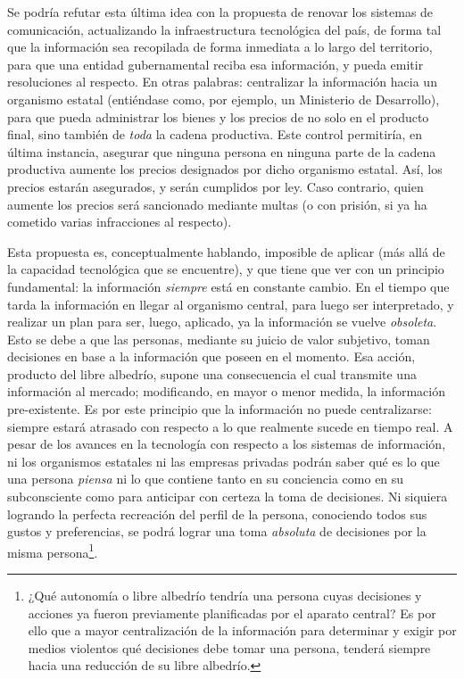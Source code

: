 \documentclass[12pt,a4paper,twoside]{book}
\begin{document}
Se podría refutar esta última idea con la propuesta de renovar los sistemas de comunicación, actualizando la infraestructura tecnológica del país, de forma tal que la información sea recopilada de forma inmediata a lo largo del territorio, para que una entidad gubernamental reciba esa información, y pueda emitir resoluciones al respecto. En otras palabras: centralizar la información hacia un organismo estatal (entiéndase como, por ejemplo, un Ministerio de Desarrollo), para que pueda administrar los bienes y los precios de no solo en el producto final, sino también de \textit{toda} la cadena productiva. Este control permitiría, en última instancia, asegurar que ninguna persona en ninguna parte de la cadena productiva aumente los precios designados por dicho organismo estatal. Así, los precios estarán asegurados, y serán cumplidos por ley. Caso contrario, quien aumente los precios será sancionado mediante multas (o con prisión, si ya ha cometido varias infracciones al respecto).

Esta propuesta es, conceptualmente hablando, imposible de aplicar (más allá de la capacidad tecnológica que se encuentre), y que tiene que ver con un principio fundamental: la información \textit{siempre} está en constante cambio. En el tiempo que tarda la información en llegar al organismo central, para luego ser interpretado, y realizar un plan para ser, luego, aplicado, ya la información se vuelve \textit{obsoleta}. Esto se debe a que las personas, mediante su juicio de valor subjetivo, toman decisiones en base a la información que poseen en el momento. Esa acción, producto del libre albedrío, supone una consecuencia el cual transmite una información al mercado; modificando, en mayor o menor medida, la información pre-existente. Es por este principio que la información no puede centralizarse: siempre estará atrasado con respecto a lo que realmente sucede en tiempo real. A pesar de los avances en la tecnología con respecto a los sistemas de información, ni los organismos estatales ni las empresas privadas podrán saber qué es lo que una persona \textit{piensa} ni lo que contiene tanto en su conciencia como en su subconsciente como para anticipar con certeza la toma de decisiones. Ni siquiera logrando la perfecta recreación del perfil de la persona, conociendo todos sus gustos y preferencias, se podrá lograr una toma \textit{absoluta} de decisiones por la misma persona\footnote{¿Qué autonomía o libre albedrío tendría una persona cuyas decisiones y acciones ya fueron previamente planificadas por el aparato central? Es por ello que a mayor centralización de la información para determinar y exigir por medios violentos qué decisiones debe tomar una persona, tenderá siempre hacia una reducción de su libre albedrío.}.
\end{document}
